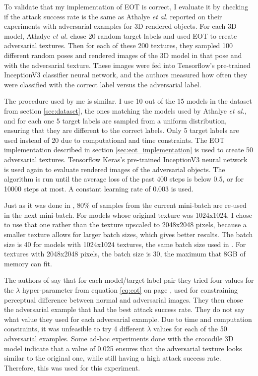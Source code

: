 To validate that my implementation of EOT is correct, I evaluate it by checking if the attack success rate is the same as Athalye \textit{et al.} \cite{athalye} reported on their experiments with adversarial examples for 3D rendered objects. For each 3D model, Athalye \textit{et al.} chose 20 random target labels and used EOT to create adversarial textures. Then for each of these 200 textures, they sampled 100 different random poses and rendered images of the 3D model in that pose and with the adversarial texture. These images were fed into Tensorflow's pre-trained InceptionV3 classifier neural network, and the authors measured how often they were classified with the correct label versus the adversarial label.

The procedure used by me is similar. I use 10 out of the 15 models in the dataset from section \ref{sec:dataset}, the ones matching the models used by Athalye \textit{et al.}, and for each one 5 target labels are sampled from a uniform distribution, ensuring that they are different to the correct labels. Only 5 target labels are used instead of 20 due to computational and time constraints. The EOT implementation described in section \ref{sec:eot_implementation} is used to create 50 adversarial textures.  Tensorflow Keras's pre-trained InceptionV3 neural network is used again to evaluate rendered images of the adversarial objects. The algorithm is run until the average loss of the past 400 steps is below 0.5, or for 10000 steps at most. A constant learning rate of 0.003 is used. 

Just as it was done in \cite{athalye}, 80\% of samples from the current mini-batch are re-used in the next mini-batch. For models whose original texture was 1024x1024, I chose to use that one rather than the texture upscaled to 2048x2048 pixels, because a smaller texture allows for larger batch sizes, which gives better results. The batch size is 40 for models with 1024x1024 textures, the same batch size used in \cite{athalye}. For textures with 2048x2048 pixels, the batch size is 30, the maximum that 8GB of memory can fit. 

The authors of \cite{athalye} say that for each model/target label pair they tried four values for the $\lambda$ hyper-parameter from equation \ref{eq:eot} on page \pageref{eq:eot}, used for constraining perceptual difference between normal and adversarial images. They then chose the adversarial example that had the best attack success rate. They do not say what value they used for each adversarial example. Due to time and computation constraints, it was unfeasible to try 4 different $\lambda$ values for each of the 50 adversarial examples. Some ad-hoc experiments done with the crocodile 3D model indicate that a value of 0.025 ensures that the adversarial texture looks similar to the original one, while still having a high attack success rate. Therefore, this was used for this experiment.

